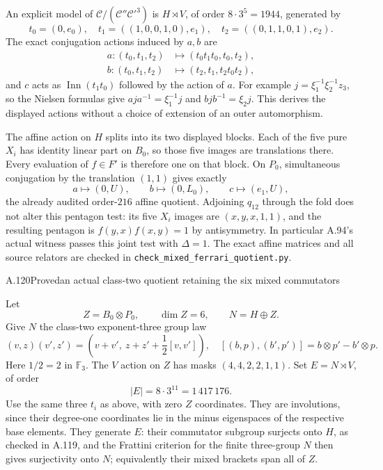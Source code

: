 An explicit model of
$\mathcal C/(\mathcal C''\mathcal C'^3)$ is
$H\rtimes V$, of order $8\cdot3^5=1944$, generated by
\[
 t_0=(0,e_0),\quad
 t_1=((1,0,0,1,0),e_1),\quad
 t_2=((0,1,1,0,1),e_2).
\]
The exact conjugation actions induced by $a,b$ are
\[
 \begin{split}
 a:(t_0,t_1,t_2)&\longmapsto(t_0t_1t_0,t_0,t_2),\\
 b:(t_0,t_1,t_2)&\longmapsto(t_2,t_1,t_2t_0t_2),
 \end{split}
\]
and $c$ acts as $\operatorname{Inn}(t_1t_0)$ followed by
the action of $a$. For example
$j=\xi_1^{-1}\xi_2^{-1}z_3$, so the Nielsen formulas give
$aja^{-1}=\xi_1^{-1}j$ and $bjb^{-1}=\xi_2j$.
This derives the displayed actions without a choice of
extension of an outer automorphism.

The affine action on $H$ splits into its two displayed
blocks. Each of the five pure $X_i$ has identity linear
part on $B_0$, so those five images are translations
there. Every evaluation of $f\in F'$ is therefore one on
that block. On $P_0$, simultaneous conjugation by the
translation $(1,1)$ gives exactly
\[
           a\mapsto(0,U),\qquad b\mapsto(0,L_0),
                    \qquad c\mapsto(e_1,U),
\]
the already audited order-$216$ affine quotient.
Adjoining $q_{12}$ through the fold does not alter this
pentagon test: its five $X_i$ images are
$(x,y,x,1,1)$, and the resulting pentagon is
$f(y,x)f(x,y)=1$ by antisymmetry.
In particular A.94's actual witness passes this joint
test with $\Delta=1$. The exact affine matrices and all
source relators are checked in
\texttt{check\_mixed\_ferrari\_quotient.py}.

\begin{statement}{A.120}{Proved}{an actual class-two quotient retaining the six mixed commutators}
\end{statement}
Let
\[
 Z=B_0\otimes P_0,\qquad\dim Z=6,
 \qquad N=H\oplus Z.
\]
Give $N$ the class-two exponent-three group law
\[
 (v,z)(v',z')=
 \left(v+v',\ z+z'+\frac12[v,v']\right),
 \quad
 [(b,p),(b',p')]=b\otimes p'-b'\otimes p.
\]
Here $1/2=2$ in $\mathbb F_3$.
The $V$ action on $Z$ has masks $(4,4,2,2,1,1)$.
Set $E=N\rtimes V$, of order
\[
                         |E|=8\cdot3^{11}=1\,417\,176.
\]
Use the same three $t_i$ as above, with zero $Z$
coordinates. They are involutions, since their degree-one
coordinates lie in the minus eigenspaces of the respective
base elements. They generate $E$: their commutator subgroup
surjects onto $H$, as checked in A.119, and the Frattini
criterion for the finite three-group $N$ then gives
surjectivity onto $N$; equivalently their mixed brackets
span all of $Z$.

